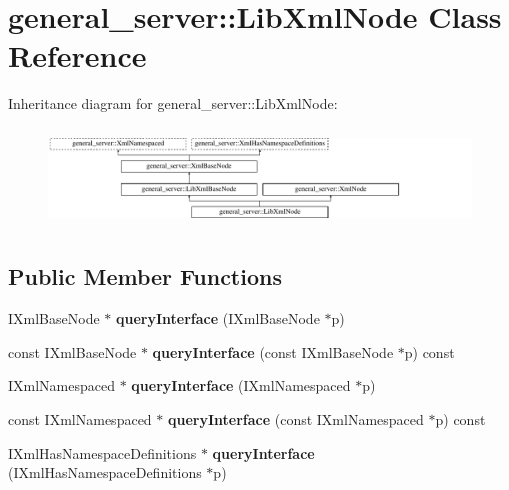 \hypertarget{classgeneral__server_1_1LibXmlNode}{\section{general\-\_\-server\-:\-:\-Lib\-Xml\-Node \-Class \-Reference}
\label{classgeneral__server_1_1LibXmlNode}
}
\-Inheritance diagram for general\-\_\-server\-:\-:\-Lib\-Xml\-Node\-:\begin{figure}[H]
\begin{center}
\leavevmode
\includegraphics[height=2.657177cm]{classgeneral__server_1_1LibXmlNode}
\end{center}
\end{figure}
\subsection*{\-Public \-Member \-Functions}
\begin{DoxyCompactItemize}
\item 
\hypertarget{classgeneral__server_1_1LibXmlNode_a2a8330d2d3a8d791cd702b25a1a48b60}{\-I\-Xml\-Base\-Node $\ast$ {\bfseries query\-Interface} (\-I\-Xml\-Base\-Node $\ast$p)}\label{classgeneral__server_1_1LibXmlNode_a2a8330d2d3a8d791cd702b25a1a48b60}

\item 
\hypertarget{classgeneral__server_1_1LibXmlNode_a59fba3b0420523eb802815cdc72eff73}{const \-I\-Xml\-Base\-Node $\ast$ {\bfseries query\-Interface} (const \-I\-Xml\-Base\-Node $\ast$p) const }\label{classgeneral__server_1_1LibXmlNode_a59fba3b0420523eb802815cdc72eff73}

\item 
\hypertarget{classgeneral__server_1_1LibXmlNode_af64ac5cc67494a90543a945843ccf076}{\-I\-Xml\-Namespaced $\ast$ {\bfseries query\-Interface} (\-I\-Xml\-Namespaced $\ast$p)}\label{classgeneral__server_1_1LibXmlNode_af64ac5cc67494a90543a945843ccf076}

\item 
\hypertarget{classgeneral__server_1_1LibXmlNode_a8ba52b5e2e4251044dc1200bdb7e5192}{const \-I\-Xml\-Namespaced $\ast$ {\bfseries query\-Interface} (const \-I\-Xml\-Namespaced $\ast$p) const }\label{classgeneral__server_1_1LibXmlNode_a8ba52b5e2e4251044dc1200bdb7e5192}

\item 
\hypertarget{classgeneral__server_1_1LibXmlNode_a9e09c7b27c16b2f8f8ec1bb93bcf848b}{\-I\-Xml\-Has\-Namespace\-Definitions $\ast$ {\bfseries query\-Interface} (\-I\-Xml\-Has\-Namespace\-Definitions $\ast$p)}\label{classgeneral__server_1_1LibXmlNode_a9e09c7b27c16b2f8f8ec1bb93bcf848b}

\end{DoxyCompactItemize}
